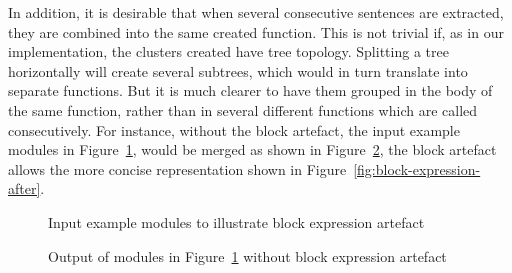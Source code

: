 In addition, it is desirable that when several consecutive sentences
are extracted, they are combined into the same created function. This
is not trivial if, as in our implementation, the clusters created
have tree topology. Splitting a tree horizontally will create several
subtrees, which would in turn translate into separate functions. But
it is much clearer to have them grouped in the body of the same function,
rather than in several different functions which are called consecutively.
For instance, without the block artefact, the input example modules in Figure~\ref{fig:block-expression-input},
would be merged as shown in Figure~\ref{fig:block-expression-before},
the block artefact allows the more concise representation shown in
Figure~\ref{fig:block-expression-after}.

\begin{figure}
\begin{minipage}[t]{0.5\textwidth}%

\end{minipage}%
\begin{minipage}[t]{0.5\textwidth}%

\end{minipage}

\caption{Input example modules to illustrate block expression artefact\label{fig:block-expression-input}}

\end{figure}

\begin{figure}
\begin{minipage}[t]{0.5\textwidth}%
%
\end{minipage}%
\begin{minipage}[t]{0.5\textwidth}%
%
\end{minipage}

\begin{minipage}[t]{1\textwidth}%
%
\end{minipage}

\caption{Output of modules in Figure~\ref{fig:block-expression-input} without
block expression artefact\label{fig:block-expression-before}}
\end{figure}


